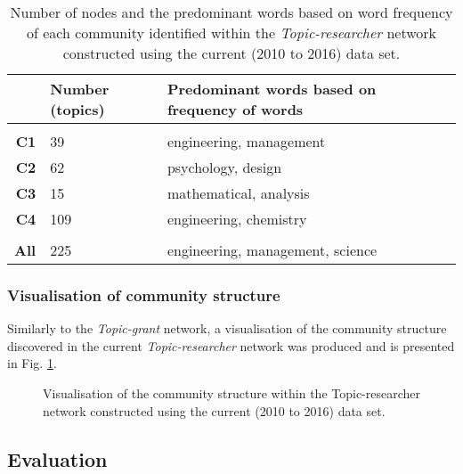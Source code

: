 \begin{table}[!htbp]
\centering
\caption[Number of nodes and the predominant words of each community identified in the \textit{Topic-researcher} network constructed using the current (2010 to 2016) data set]{Number of nodes and the predominant words based on word frequency of each community identified within the \textit{Topic-researcher} network constructed using the current (2010 to 2016) data set.}
\label{table:topic_b_current_numbers}
\begin{tabular}{r|>{\raggedleft\arraybackslash}p{1.6cm}>{\raggedleft\arraybackslash}p{6.5cm}}
{} & \textbf{Number (topics)} & \textbf{Predominant words based on frequency of words}\\
\hline\\
\textbf{C1}  & {39}  & {engineering, management}\\
\textbf{C2}  & {62}  & {psychology, design}\\
\textbf{C3}  & {15}  & {mathematical, analysis}\\
\textbf{C4}  & {109} & {engineering, chemistry}\\
\hline\\
\textbf{All} & {225} & {engineering, management, science}\\
\end{tabular}
\end{table}

\subsubsection{Visualisation of community structure}

Similarly to the \textit{Topic-grant} network, a visualisation of the community structure discovered in the current \textit{Topic-researcher} network was produced and is presented in Fig. \ref{figure:topic_b_current_cs}.

\begin{figure}[htpb]
    \centering
    \caption[Visualisation of the community structure within the Topic-researcher network constructed using the current (2010 to 2016) data set.]{Visualisation of the community structure within the Topic-researcher network constructed using the current (2010 to 2016) data set.}
    \label{figure:topic_b_current_cs}
\end{figure}

\subsection{Evaluation}


